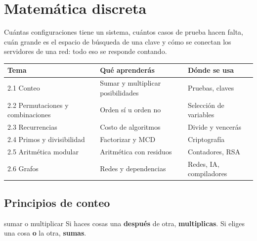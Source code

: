 \chapter{Matem\'atica discreta}
\label{cap:discreta}

\begin{tmsistemas}
Cu\'antas configuraciones tiene un sistema, cu\'antos casos de prueba hacen falta, cu\'an grande es el espacio de b\'usqueda de una clave y c\'omo se conectan los servidores de una red: todo eso se responde contando.
\end{tmsistemas}

\begin{center}
\begin{tabular}{|p{4.2cm}|p{4.8cm}|p{3.8cm}|}
\hline
\rowcolor{tmAzulClaro}\textbf{Tema} & \textbf{Qu\'e aprender\'as} & \textbf{D\'onde se usa}\\ \hline
2.1 Conteo & Sumar y multiplicar posibilidades & Pruebas, claves\\ \hline
2.2 Permutaciones y combinaciones & Orden s\'i u orden no & Selecci\'on de variables\\ \hline
2.3 Recurrencias & Costo de algoritmos & Divide y vencer\'as\\ \hline
2.4 Primos y divisibilidad & Factorizar y MCD & Criptograf\'ia\\ \hline
2.5 Aritm\'etica modular & Aritm\'etica con residuos & Contadores, RSA\\ \hline
2.6 Grafos & Redes y dependencias & Redes, IA, compiladores\\ \hline
\end{tabular}
\end{center}

\section{Principios de conteo}
\label{sec:2-1}

\begin{tmconcepto}{sumar o multiplicar}
Si haces cosas una \textbf{despu\'es} de otra, \textbf{multiplicas}. Si eliges una cosa \textbf{o} la otra, \textbf{sumas}.
\end{tmconcepto}

